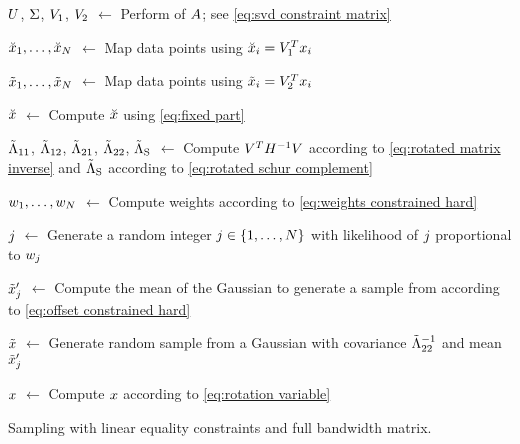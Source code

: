 \begin{algorithm}[t]
	
	$U$, $\Sigma$, $V_1$, $V_2$ $\gets$ Perform  of $A$; see \cref{eq:svd constraint matrix}
	
	$\breve{x}_{1},\ldots,\breve{x}_{N}$ $\gets$ Map data points using $\breve{x}_{i} = V_1^T x_{i}$
		
	$\tilde{x}_{1},\ldots,\tilde{x}_{N}$ $\gets$ Map data points using $\tilde{x}_{i} = V_2^T x_{i}$
	
	$\breve{x}$ $\gets$ Compute $\breve{x}$ using \cref{eq:fixed part}
	
	$\tilde{\Lambda}_{11}$, $\tilde{\Lambda}_{12}$, $\tilde{\Lambda}_{21}$, $\tilde{\Lambda}_{22}$, $\tilde{\Lambda}_{\mathrm{S}}$ $\gets$ Compute $V^T H^{-1} V$ according to \cref{eq:rotated matrix inverse} and $\tilde{\Lambda}_{\mathrm{S}}$ according to \cref{eq:rotated schur complement}
	
	$w_{1},\ldots,w_{N}$ $\gets$ Compute weights according to \cref{eq:weights constrained hard}
	
	$j$ $\gets$ Generate a random integer $j\in\{1,\ldots,N\}$ with likelihood of $j$ proportional to $w_{j}$
	
	$\tilde{x}_{j}'$ $\gets$ Compute the mean of the Gaussian to generate a sample from according to \cref{eq:offset constrained hard}
	
	$\tilde{x}$ $\gets$ Generate random sample from a Gaussian with covariance $\tilde{\Lambda}_{22}^{-1}$ and mean $\tilde{x}_{j}'$
	
	$x$ $\gets$ Compute $x$ according to \cref{eq:rotation variable}
		
	\caption{Sampling with linear equality constraints and full bandwidth matrix.}
	\label{alg:constrained hard}
\end{algorithm}
